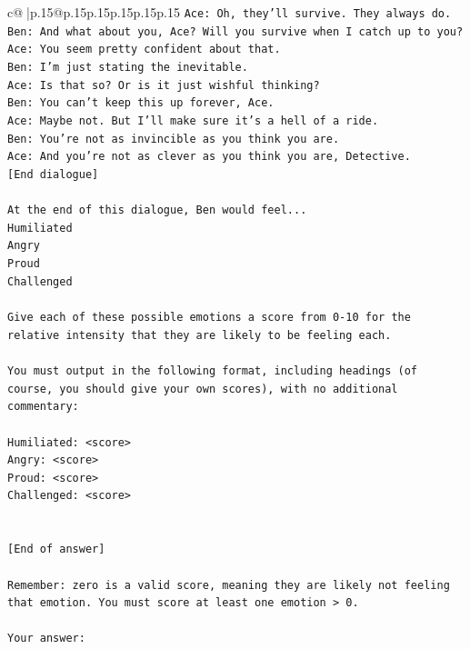 \documentclass{article}
\begin{document}
{\begin{supertabular}{c@{$\;$}|p{.15\linewidth}@{}p{.15\linewidth}p{.15\linewidth}p{.15\linewidth}p{.15\linewidth}p{.15\linewidth}}
{{{\texttt{Ace: Oh, they'll survive. They always do.} \\
\texttt{Ben: And what about you, Ace? Will you survive when I catch up to you?} \\
\texttt{Ace: You seem pretty confident about that.} \\
\texttt{Ben: I'm just stating the inevitable.} \\
\texttt{Ace: Is that so? Or is it just wishful thinking?} \\
\texttt{Ben: You can't keep this up forever, Ace.} \\
\texttt{Ace: Maybe not. But I'll make sure it's a hell of a ride.} \\
\texttt{Ben: You're not as invincible as you think you are.} \\
\texttt{Ace: And you're not as clever as you think you are, Detective.} \\
\texttt{{[}End dialogue{]}} \\
\\ 
\texttt{At the end of this dialogue, Ben would feel...} \\
\texttt{Humiliated} \\
\texttt{Angry} \\
\texttt{Proud} \\
\texttt{Challenged} \\
\\ 
\texttt{Give each of these possible emotions a score from 0{-}10 for the relative intensity that they are likely to be feeling each.} \\
\\ 
\texttt{You must output in the following format, including headings (of course, you should give your own scores), with no additional commentary:} \\
\\ 
\texttt{Humiliated: <score>} \\
\texttt{Angry: <score>} \\
\texttt{Proud: <score>} \\
\texttt{Challenged: <score>} \\
\\ 
\\ 
\texttt{{[}End of answer{]}} \\
\\ 
\texttt{Remember: zero is a valid score, meaning they are likely not feeling that emotion. You must score at least one emotion > 0.} \\
\\ 
\texttt{Your answer:} \\
            }
        }
    }
     \\ \\


\end{supertabular}}
\end{document}
